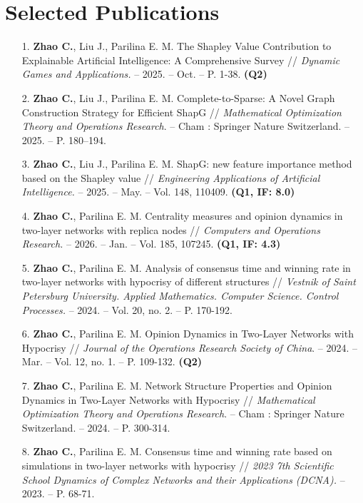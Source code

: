 \documentclass[letterpaper,10pt]{article}
\begin{document}
\section{Selected Publications}
\begin{enumerate}
  \fontsize{10}{10.5}\selectfont
  \item [1.] \textbf{Zhao C.}, Liu J., Parilina E. M. The Shapley Value Contribution to Explainable Artificial Intelligence: A Comprehensive Survey // {\it Dynamic Games and Applications.} -- 2025. -- Oct. -- P. 1-38. {\bf (Q2)}
  \item [2.] \textbf{Zhao C.}, Liu J., Parilina E. M. Complete-to-Sparse: A Novel Graph Construction Strategy for Efficient ShapG // {\it Mathematical Optimization Theory and Operations Research}. -- Cham : Springer Nature Switzerland. -- 2025. -- P. 180–194.
  \item [3.] \textbf{Zhao C.}, Liu J., Parilina E. M. ShapG: new feature importance method based on the Shapley value // {\it Engineering Applications of Artificial Intelligence.} -- 2025. -- May. -- Vol. 148, 110409. {\bf (Q1, IF: 8.0)}
  \item [4.] \textbf{Zhao C.}, Parilina E. M. Centrality measures and opinion dynamics in two-layer networks with replica nodes // {\it Computers and Operations Research.} -- 2026. -- Jan. -- Vol. 185, 107245. {\bf (Q1, IF: 4.3)}
  \item [5.] \textbf{Zhao C.}, Parilina E. M. Analysis of consensus time and winning rate in two-layer networks with hypocrisy of different structures // {\it Vestnik of Saint Petersburg University. Applied Mathematics. Computer Science. Control Processes.} -- 2024. -- Vol. 20, no. 2. -- P. 170-192.
  \item [6.] \textbf{Zhao C.}, Parilina E. M. Opinion Dynamics in Two-Layer Networks with Hypocrisy // {\it Journal of the Operations Research Society of China}. -- 2024. -- Mar. -- Vol. 12, no. 1. -- P. 109-132. {\bf (Q2)}
  \item [7.] \textbf{Zhao C.}, Parilina E. M. Network Structure Properties and Opinion Dynamics in Two-Layer Networks with Hypocrisy // {\it Mathematical Optimization Theory and Operations Research}. -- Cham : Springer Nature Switzerland. -- 2024. -- P. 300-314.
        \newpage
  \item [8.] \textbf{Zhao C.}, Parilina E. M. Consensus time and winning rate based on simulations in two-layer networks with hypocrisy // {\it 2023 7th Scientific School Dynamics of Complex Networks and their Applications (DCNA).} -- 2023. -- P. 68-71.
\end{enumerate}
\end{document}

